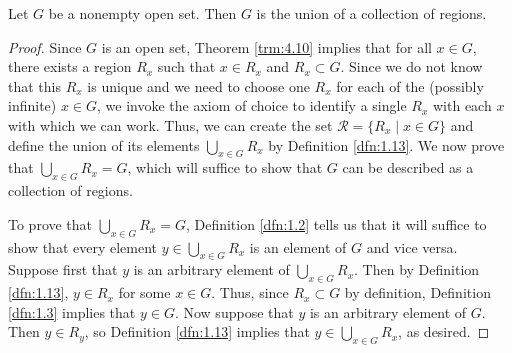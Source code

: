 \documentclass[../main.tex]{subfiles}
\begin{document}
\begin{theorem}\label{trm:4.14}
    Let $G$ be a nonempty open set. Then $G$ is the union of a collection of regions.
    \begin{proof}
        Since $G$ is an open set, Theorem \ref{trm:4.10} implies that for all $x\in G$, there exists a region $R_x$ such that $x\in R_x$ and $R_x\subset G$. Since we do not know that this $R_x$ is unique and we need to choose one $R_x$ for each of the (possibly infinite) $x\in G$, we invoke the axiom of choice to identify a single $R_x$ with each $x$ with which we can work. Thus, we can create the set $\mathcal{R}=\{R_x\mid x\in G\}$ and define the union of its elements $\bigcup_{x\in G}R_x$ by Definition \ref{dfn:1.13}. We now prove that $\bigcup_{x\in G}R_x=G$, which will suffice to show that $G$ can be described as a collection of regions.\par
        To prove that $\bigcup_{x\in G}R_x=G$, Definition \ref{dfn:1.2} tells us that it will suffice to show that every element $y\in\bigcup_{x\in G}R_x$ is an element of $G$ and vice versa. Suppose first that $y$ is an arbitrary element of $\bigcup_{x\in G}R_x$. Then by Definition \ref{dfn:1.13}, $y\in R_x$ for some $x\in G$. Thus, since $R_x\subset G$ by definition, Definition \ref{dfn:1.3} implies that $y\in G$. Now suppose that $y$ is an arbitrary element of $G$. Then $y\in R_y$, so Definition \ref{dfn:1.13} implies that $y\in\bigcup_{x\in G}R_x$, as desired.
    \end{proof}
\end{theorem}
\end{document}
